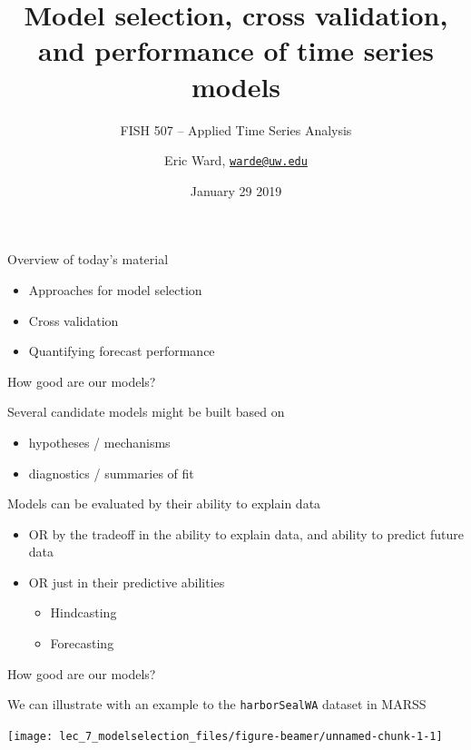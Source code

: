 \documentclass[ignorenonframetext,]{beamer}
\title{Model selection, cross validation, and performance of time series models}
\subtitle{FISH 507 -- Applied Time Series Analysis}
\author{Eric Ward, \href{mailto:warde@uw.edu}{\nolinkurl{warde@uw.edu}}}
\date{January 29 2019}
\providecommand{\tightlist}{%
  \setlength{\itemsep}{0pt}\setlength{\parskip}{0pt}}
\begin{document}
\frame{\titlepage}

\begin{frame}[fragile]

\begin{block}{Overview of today's material}

\begin{itemize}
\tightlist
\item
  Approaches for model selection
\item
  Cross validation
\item
  Quantifying forecast performance
\end{itemize}

\end{block}

\begin{block}{How good are our models?}

Several candidate models might be built based on

\begin{itemize}
\tightlist
\item
  hypotheses / mechanisms
\item
  diagnostics / summaries of fit
\end{itemize}

Models can be evaluated by their ability to explain data

\begin{itemize}
\tightlist
\item
  OR by the tradeoff in the ability to explain data, and ability to
  predict future data
\item
  OR just in their predictive abilities

  \begin{itemize}
  \tightlist
  \item
    Hindcasting
  \item
    Forecasting
  \end{itemize}
\end{itemize}

\end{block}

\begin{block}{How good are our models?}

We can illustrate with an example to the \texttt{harborSealWA} dataset
in MARSS

\begin{center}\texttt{[image: lec\_7\_modelselection\_files/figure-beamer/unnamed-chunk-1-1]} \end{center}


\end{block}
\end{frame}
\end{document}
